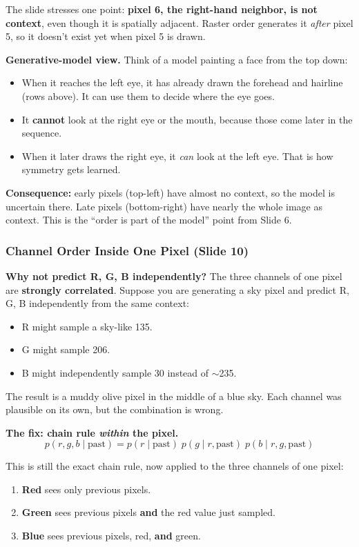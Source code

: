 The slide stresses one point: \textbf{pixel 6, the right-hand neighbor, is not context}, even though it is spatially adjacent. Raster order generates it \textit{after} pixel 5, so it doesn't exist yet when pixel 5 is drawn.

\textbf{Generative-model view.} Think of a model painting a face from the top down:
\begin{itemize}
  \item When it reaches the left eye, it has already drawn the forehead and hairline (rows above). It can use them to decide where the eye goes.
  \item It \textbf{cannot} look at the right eye or the mouth, because those come later in the sequence.
  \item When it later draws the right eye, it \textit{can} look at the left eye. That is how symmetry gets learned.
\end{itemize}

\textbf{Consequence:} early pixels (top-left) have almost no context, so the model is uncertain there. Late pixels (bottom-right) have nearly the whole image as context. This is the ``order is part of the model'' point from Slide 6.

\subsubsection*{Channel Order Inside One Pixel (Slide 10)}

\textbf{Why not predict R, G, B independently?} The three channels of one pixel are \textbf{strongly correlated}. Suppose you are generating a sky pixel and predict R, G, B independently from the same context:
\begin{itemize}
  \item R might sample a sky-like 135.
  \item G might sample 206.
  \item B might independently sample 30 instead of $\sim$235.
\end{itemize}
The result is a muddy olive pixel in the middle of a blue sky. Each channel was plausible on its own, but the combination is wrong.

\textbf{The fix: chain rule \textit{within} the pixel.}
$$p(r, g, b \mid \text{past}) = p(r \mid \text{past})\; p(g \mid r, \text{past})\; p(b \mid r, g, \text{past})$$

This is still the exact chain rule, now applied to the three channels of one pixel:
\begin{enumerate}
  \item \textbf{Red} sees only previous pixels.
  \item \textbf{Green} sees previous pixels \textbf{and} the red value just sampled.
  \item \textbf{Blue} sees previous pixels, red, \textbf{and} green.
\end{enumerate}

